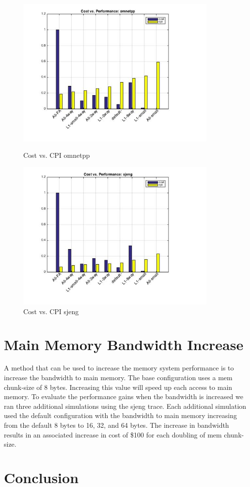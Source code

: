 \documentclass[11pt,titlepage]{article}
\begin{document}
        \begin{figure}[H]
            \centering
            \begin{minipage}{.5\textwidth}
                \centering
                \includegraphics[width=10cm]{cvpomnetpp}
                \caption{Cost vs. CPI omnetpp}
                \label{fig:cvomnetpp}
            \end{minipage}%
            \begin{minipage}{.5\textwidth}
                \centering
                \includegraphics[width=10cm]{cvpsjeng}
                \caption{Cost vs. CPI sjeng}
                \label{fig:cvpsjeng}
            \end{minipage}
        \end{figure}

\section{Main Memory Bandwidth Increase}
   A method that can be used to increase the memory system performance is to increase the bandwidth to main memory. The base configuration uses a mem chunk-size of 8 bytes. Increasing this value will speed up each access to main memory. To evaluate the performance gains when the bandwidth is increased we ran three additional simulations using the sjeng trace. Each additional simulation used the default configuration with the bandwidth to main memory increasing from the default 8 bytes to 16, 32, and 64 bytes. The increase in bandwidth results in an associated increase in cost of \$100 for each doubling of mem chunk-size.

\section{Conclusion}
\end{document}

